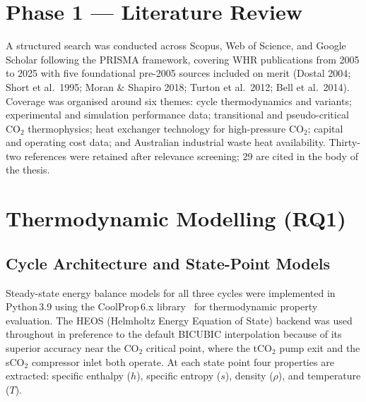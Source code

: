 \section{Phase 1 --- Literature Review}
\label{sec:method_lit}

A structured search was conducted across Scopus, Web of Science, and Google
Scholar following the PRISMA framework, covering WHR publications from 2005
to 2025 with five foundational pre-2005 sources included on merit (Dostal
2004; Short et al.\ 1995; Moran \& Shapiro 2018; Turton et al.\ 2012; Bell
et al.\ 2014). Coverage was organised around six themes: cycle thermodynamics
and variants; experimental and simulation performance data; transitional and
pseudo-critical CO$_2$ thermophysics; heat exchanger technology for
high-pressure CO$_2$; capital and operating cost data; and Australian
industrial waste heat availability. Thirty-two references were retained after
relevance screening; 29 are cited in the body of the thesis.

\section{Thermodynamic Modelling (RQ1)}
\label{sec:method_thermo}

\subsection{Cycle Architecture and State-Point Models}

Steady-state energy balance models for all three cycles were implemented in
Python\,3.9 using the CoolProp\,6.x library~\cite{Bell2014} for
thermodynamic property evaluation. The HEOS (Helmholtz Energy Equation of
State) backend was used throughout in preference to the default BICUBIC
interpolation because of its superior accuracy near the CO$_2$ critical
point, where the tCO$_2$ pump exit and the sCO$_2$ compressor inlet both
operate. At each state point four properties are extracted: specific enthalpy
($h$), specific entropy ($s$), density ($\rho$), and temperature ($T$).

